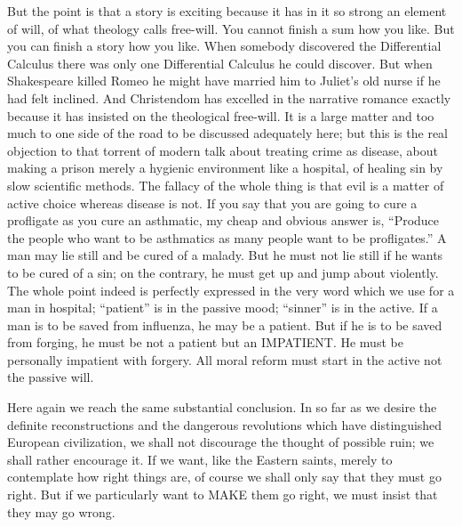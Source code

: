 But the point is that a story is exciting because it has in it so strong an element of will, of what theology calls free-will. You cannot finish a sum how you like. But you can finish a story how you like. When somebody discovered the Differential Calculus there was only one Differential Calculus he could discover. But when Shakespeare killed Romeo he might have married him to Juliet’s old nurse if he had felt inclined. And Christendom has excelled in the narrative romance exactly because it has insisted on the theological free-will. It is a large matter and too much to one side of the road to be discussed adequately here; but this is the real objection to that torrent of modern talk about treating crime as disease, about making a prison merely a hygienic environment like a hospital, of healing sin by slow scientific methods. The fallacy of the whole thing is that evil is a matter of active choice whereas disease is not. If you say that you are going to cure a profligate as you cure an asthmatic, my cheap and obvious answer is, “Produce the people who want to be asthmatics as many people want to be profligates.” A man may lie still and be cured of a malady. But he must not lie still if he wants to be cured of a sin; on the contrary, he must get up and jump about violently. The whole point indeed is perfectly expressed in the very word which we use for a man in hospital; “patient” is in the passive mood; “sinner” is in the active. If a man is to be saved from influenza, he may be a patient. But if he is to be saved from forging, he must be not a patient but an IMPATIENT. He must be personally impatient with forgery. All moral reform must start in the active not the passive will.

Here again we reach the same substantial conclusion. In so far as we desire the definite reconstructions and the dangerous revolutions which have distinguished European civilization, we shall not discourage the thought of possible ruin; we shall rather encourage it. If we want, like the Eastern saints, merely to contemplate how right things are, of course we shall only say that they must go right. But if we particularly want to MAKE them go right, we must insist that they may go wrong.

